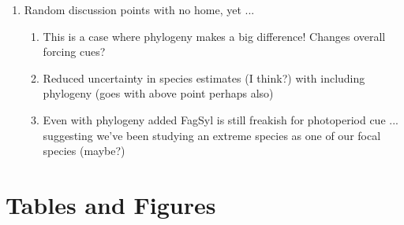 \documentclass{article}\usepackage[]{graphicx}\usepackage[]{color}
\begin{document}
\begin{enumerate}
\item Random discussion points with no home, yet ... 
\begin{enumerate}
\item This is a case where phylogeny makes a big difference! Changes overall forcing cues? 
\item Reduced uncertainty in species estimates (I think?) with including phylogeny (goes with above point perhaps also)
\item Even with phylogeny added FagSyl is still freakish for photoperiod cue ... suggesting we've been studying an extreme species as one of our focal species (maybe?)
\end{enumerate}
\end{enumerate}

\section*{Tables and Figures} 
\end{document}
